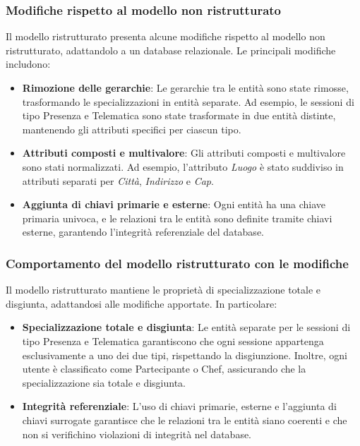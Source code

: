 \subsubsection{Modifiche rispetto al modello non ristrutturato}
Il modello ristrutturato presenta alcune modifiche rispetto al modello non ristrutturato, adattandolo a un database relazionale. Le principali modifiche includono:
\begin{itemize}
    \item \textbf{Rimozione delle gerarchie}: Le gerarchie tra le entità sono state rimosse, trasformando le specializzazioni in entità separate. Ad esempio, le sessioni di tipo Presenza e Telematica sono state trasformate in due entità distinte, mantenendo gli attributi specifici per ciascun tipo.
    \item \textbf{Attributi composti e multivalore}: Gli attributi composti e multivalore sono stati normalizzati. Ad esempio, l'attributo \textit{Luogo} è stato suddiviso in attributi separati per \textit{Città}, \textit{Indirizzo} e \textit{Cap}.
    \item \textbf{Aggiunta di chiavi primarie e esterne}: Ogni entità ha una chiave primaria univoca, e le relazioni tra le entità sono definite tramite chiavi esterne, garantendo l'integrità referenziale del database.
\end{itemize}

\subsubsection{Comportamento del modello ristrutturato con le modifiche}
Il modello ristrutturato mantiene le proprietà di specializzazione totale e disgiunta, adattandosi alle modifiche apportate. In particolare:
\begin{itemize}
    \item \textbf{Specializzazione totale e disgiunta}: Le entità separate per le sessioni di tipo Presenza e Telematica garantiscono che ogni sessione appartenga esclusivamente a uno dei due tipi, rispettando la disgiunzione. Inoltre, ogni utente è classificato come Partecipante o Chef, assicurando che la specializzazione sia totale e disgiunta.
    \item \textbf{Integrità referenziale}: L'uso di chiavi primarie, esterne e l'aggiunta di chiavi surrogate garantisce che le relazioni tra le entità siano coerenti e che non si verifichino violazioni di integrità nel database.
\end{itemize}

